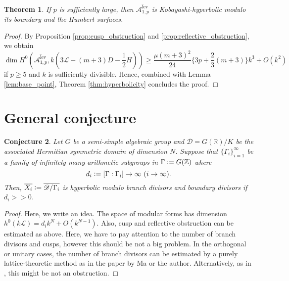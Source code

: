 \documentclass[12pt, pdftex]{amsart}
\theoremstyle{plain}
\newtheorem{thm}{Theorem}[section]
\newtheorem{conj}[thm]{Conjecture}
\theoremstyle{definition}
\numberwithin{equation}{section}
\def\A{{\mathbb A}}
\def\R{{\mathbb R}}
\def\Z{{\mathbb Z}}
\def\dim{\mathop{\mathrm{dim}}\nolimits}
\def\lev{\mathrm{lev}}
\def\L{\mathscr{L}}
\def\A{\mathcal{A}}
\def\D{\mathscr{D}}
\newcommand{\defeq}{\vcentcolon=}
\begin{document}
\begin{thm}
\label{thm:hyperbolicity_abelian_surfac}
If $p$ is sufficiently large, then $\overline{\A_{1,p}^{\lev}}$ is Kobayashi-hyperbolic modulo its boundary and the Humbert surfaces.
\end{thm}
\begin{proof}
    By Proposition \ref{prop:cusp_obstruction} and \ref{prop:reflective_obstruction}, we obtain
    \[\dim H^0 (\overline{\A_{1,p}^{\lev}}, k(3\L-(m+3)D-\frac{1}{2}H)) \geq \frac{\mu(m+3)^2}{24}\{3p+\frac{2}{3}(m+3)\}k^3 + O(k^2)\]
    if $p\geq 5$ and $k$ is sufficiently divisible.
    Hence, combined with Lemma \ref{lem:base_point}, Theorem \ref{thm:hyperbolicity} concludes the proof.
\end{proof}

\section{General conjecture}
\begin{conj}
Let $G$ be a semi-simple algebraic group and $\D=G(\R)/K$ be the associated Hermitian symmetric domain of dimension $N$.
Suppose that $\{\Gamma_i\}_{i=1}^{\infty}$ be a family of infinitely many arithmetic subgroups in $\Gamma\defeq G(\Z)$ where 
\[d_i\defeq [\Gamma : \Gamma_i]\to\infty\ (i\to\infty).\]
Then, $\overline{X_i}\defeq \overline{\D/\Gamma_i}$ is hyperbolic modulo branch divisors and boundary divisors if $d_i>>0$.
\end{conj}
\begin{proof}
Here, we write an idea.
The space of modular forms has dimension $h^0(k\L)=d_ik^N+O(k^{N-1})$.
Also, cusp and reflective obstruction can be estimated as above.
Here, we have to pay attention to the number of branch divisors and cusps, however this should be not a big problem.
In the orthogonal or unitary cases, the number of branch divisors can be estimated by a purely lattice-theoretic method as in the paper by Ma or the author.
Alternatively, as in \cite[Corollary 4.7, Theorem 4.19]{HS94}, this might be not an obstruction.
\end{proof}
\end{document}
